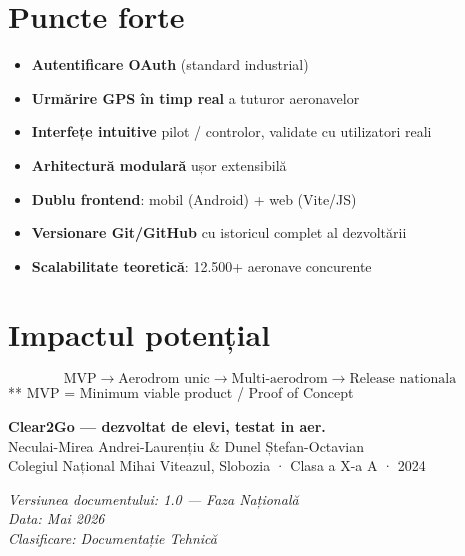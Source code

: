 \documentclass[11pt,a4paper]{report}
\begin{document}
\section{Puncte forte}

\begin{itemize}
    \item \textbf{Autentificare OAuth} (standard industrial)
    \item \textbf{Urmărire GPS în timp real} a tuturor aeronavelor
    \item \textbf{Interfețe intuitive} pilot / controlor, validate cu utilizatori reali
    \item \textbf{Arhitectură modulară} ușor extensibilă
    \item \textbf{Dublu frontend}: mobil (Android) + web (Vite/JS)
    \item \textbf{Versionare Git/GitHub} cu istoricul complet al dezvoltării
    \item \textbf{Scalabilitate teoretică}: 12.500+ aeronave concurente
\end{itemize}

\section{Impactul potențial}

\[
\text{MVP} \rightarrow \text{Aerodrom unic} \rightarrow
\text{Multi-aerodrom} \rightarrow \text{Release nationala}
\]
** MVP = Minimum viable product / Proof of Concept

\vspace{1em}

\begin{mdframed}[backgroundcolor=blue!5, linecolor=blue!50, linewidth=1.5pt]
\begin{center}
\textbf{Clear2Go — dezvoltat de elevi, testat in aer.}\\[0.3em]
\small Neculai-Mirea Andrei-Laurențiu \& Dunel Ștefan-Octavian\\
Colegiul Național Mihai Viteazul, Slobozia · Clasa a X-a A · 2024
\end{center}
\end{mdframed}

\vspace{2cm}
\noindent \textit{Versiunea documentului: 1.0 — Faza Națională}\\
\textit{Data: Mai 2026}\\
\textit{Clasificare: Documentație Tehnică}\\
\end{document}
